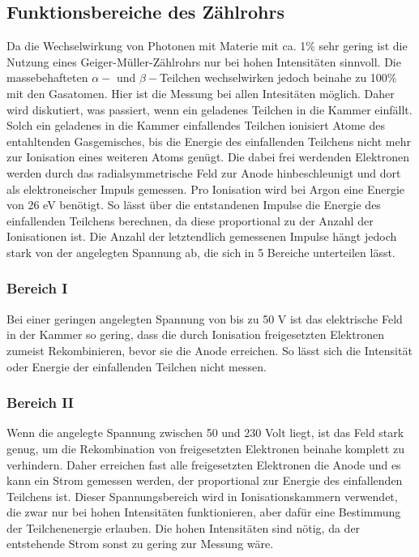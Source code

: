 \documentclass[titlepage = firstcover]{scrartcl}
\begin{document}
        \subsection{Funktionsbereiche des Zählrohrs}
            Da die Wechselwirkung von Photonen mit Materie mit ca. 1\% sehr gering ist die Nutzung eines Geiger-Müller-Zählrohrs nur bei hohen Intensitäten sinnvoll. Die massebehafteten $\alpha-$ und
            $\beta-$Teilchen wechselwirken jedoch beinahe zu 100\% mit den Gasatomen. Hier ist die Messung bei allen Intesitäten möglich. Daher wird diskutiert, was passiert, wenn ein geladenes
            Teilchen in die Kammer einfällt.
            Solch ein geladenes in die Kammer einfallendes Teilchen ionisiert Atome des entahltenden Gasgemisches, bis die Energie des einfallenden Teilchens nicht mehr zur Ionisation eines weiteren
            Atoms genügt. Die dabei frei werdenden Elektronen werden durch das radialsymmetrische Feld zur Anode hinbeschleunigt und dort als elektroneischer Impuls gemessen. Pro Ionisation 
            wird bei Argon eine Energie von 26 eV benötigt. So lässt über die entstandenen Impulse die Energie des einfallenden Teilchens berechnen, da diese proportional zu der Anzahl der
            Ionisationen ist. Die Anzahl der letztendlich gemessenen Impulse hängt jedoch stark von der angelegten Spannung ab, die sich in 5 Bereiche unterteilen lässt.

            \subsubsection*{Bereich I}
                Bei einer geringen angelegten Spannung von bis zu 50 V ist das elektrische Feld in der Kammer so gering, dass die durch Ionisation freigesetzten Elektronen zumeist Rekombinieren, bevor
                sie die Anode erreichen. So lässt sich die Intensität oder Energie der einfallenden Teilchen nicht messen.

            \subsubsection*{Bereich II}
                Wenn die angelegte Spannung zwischen 50 und 230 Volt liegt, ist das Feld stark genug, um die Rekombination von freigesetzten Elektronen beinahe komplett zu verhindern. Daher erreichen
                fast alle freigesetzten Elektronen die Anode und es kann ein Strom gemessen werden, der proportional zur Energie des einfallenden Teilchens ist. Dieser Spannungsbereich wird in
                Ionisationskammern verwendet, die zwar nur bei hohen Intensitäten funktionieren, aber dafür eine Bestimmung der Teilchenenergie erlauben. Die hohen Intensitäten sind nötig, da der 
                entstehende Strom sonst zu gering zur Messung wäre.
\end{document}
